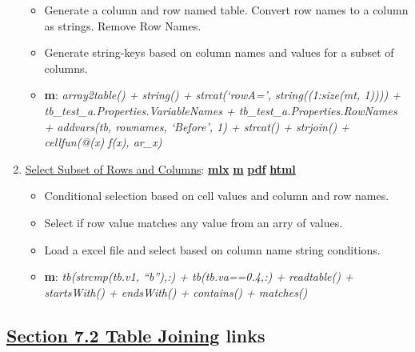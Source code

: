 \documentclass[
]{book}
\providecommand{\tightlist}{%
  \setlength{\itemsep}{0pt}\setlength{\parskip}{0pt}}
\begin{document}
\begin{enumerate}
  \begin{itemize}
  \tightlist
  \item
    Generate a column and row named table. Convert row names to a column as strings. Remove Row Names.
  \item
    Generate string-keys based on column names and values for a subset of columns.
  \item
    \textbf{m}: \emph{array2table() + string() + strcat(`rowA=', string((1:size(mt, 1)))) + tb\_test\_a.Properties.VariableNames + tb\_test\_a.Properties.RowNames + addvars(tb, rownames, `Before', 1) + strcat() + strjoin() + cellfun(@(x) f(x), ar\_x)}
  \end{itemize}
\item
  \href{https://fanwangecon.github.io/M4Econ/table/main/htmlpdfm/fs_tab_select_rows_cols.html}{Select Subset of Rows and Columns}: \href{https://github.com/FanWangEcon/M4Econ/blob/master/table/main/fs_tab_select_rows_cols.mlx}{\textbf{mlx}} \textbar{} \href{https://github.com/FanWangEcon/M4Econ/blob/master/table/main/htmlpdfm/fs_tab_select_rows_cols.m}{\textbf{m}} \textbar{} \href{https://github.com/FanWangEcon/M4Econ/blob/master/table/main/htmlpdfm/fs_tab_select_rows_cols.pdf}{\textbf{pdf}} \textbar{} \href{https://fanwangecon.github.io/M4Econ/table/main/htmlpdfm/fs_tab_select_rows_cols.html}{\textbf{html}}

  \begin{itemize}
  \tightlist
  \item
    Conditional selection based on cell values and column and row names.
  \item
    Select if row value matches any value from an arry of values.
  \item
    Load a excel file and select based on column name string conditions.
  \item
    \textbf{m}: \emph{tb(strcmp(tb.v1, ``b''),:) + tb(tb.va==0.4,:) + readtable() + startsWith() + endsWith() + contains() + matches()}
  \end{itemize}
\end{enumerate}

\hypertarget{section-7.2-table-joiningtable-joining-links}{%
\subsection{\texorpdfstring{\protect\hyperlink{table-joining}{Section 7.2 Table Joining} links}{Section 7.2 Table Joining links}}\label{section-7.2-table-joiningtable-joining-links}}
\end{document}
